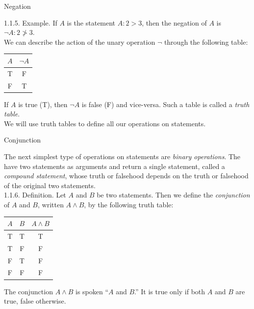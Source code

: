 \documentclass[smaller,hyperref={CJKbookmarks=true}]{beamer}
\begin{document}
\begin{frame}[c]{Negation}
\begin{spacing}{1.1}
\alert{1.1.5. Example.} If $A$ is the statement $A\!:2>3$, then the negation of $A$ is $\neg A\!:2\ngtr 3$.\\[4pt]
We can describe the action of the unary operation $\neg$ through the following table:
\begin{center}
\begin{tabular}{c|c}
  $A$ & $\neg A$ \\ \hline
  T & F \\
  F & T \\
\end{tabular}
\end{center}
If $A$ is true (T), then $\neg A$ is false (F) and vice-versa. Such a table is called a \emph{truth table}.\\[5pt]
We will use truth tables to define all our operations on statements.
\end{spacing}
\end{frame}
\begin{frame}[t]{Conjunction}
\begin{spacing}{1.1}
The next simplest type of operations on statements are \emph{binary operations}.
The have two statements as arguments and return a single statement,
called a \emph{compound statement}, whose truth or falsehood depends on the
truth or falsehood of the original two statements.\\[4pt]
\alert{1.1.6. Definition.} Let $A$ and $B$ be two statements. Then we define the \emph{conjunction} of $A$ and $B$, written $A\wedge B$, by the following truth table:
\begin{center}
  \begin{tabular}{c|c|c}
    $A$ & $B$ & $A\wedge B$ \\ \hline
    T & T & T \\
    T & F & F \\
    F & T & F \\
    F & F & F
  \end{tabular}
\end{center}
The conjunction $A\wedge B$ is spoken ``$A$ and $B$.'' It is true only if both $A$ and $B$ are true, false otherwise.
\end{spacing}
\end{frame}
\end{document}
